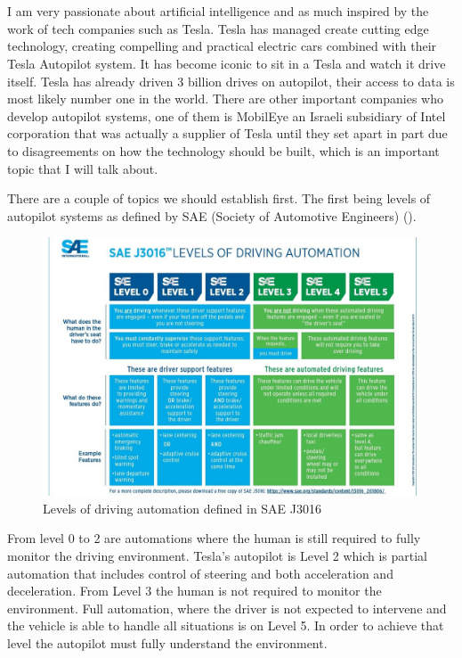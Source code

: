 \chapter{\bevezetes}

I am very passionate about artificial intelligence and as much inspired by the
work of tech companies such as Tesla. Tesla has managed create cutting edge
technology, creating compelling and practical electric cars combined with their
Tesla Autopilot system. It has become iconic to sit in a Tesla and watch it
drive itself. Tesla has already driven 3 billion drives on autopilot, their
access to data is most likely number one in the world. There are other important
companies who develop autopilot systems, one of them is MobilEye an Israeli
subsidiary of Intel corporation that was actually a supplier of Tesla until they
set apart in part due to disagreements on how the technology should be built,
which is an important topic that I will talk about.

There are a couple of topics we should establish first. The first being levels
of autopilot systems as defined by SAE (Society of Automotive Engineers)
(). 

\begin{figure}[!ht]
    \centering
    \includegraphics[width=150mm, keepaspectratio]{figures/levels-of-ad.jpg}
    \caption{Levels of driving automation defined in SAE J3016 \cite{j3016b}}
    \label{fig:J3016}
\end{figure}

From level 0 to 2 are automations where the human is still required to fully
monitor the driving environment. Tesla's autopilot is Level 2 which is partial
automation that includes control of steering and both acceleration and
deceleration. From Level 3 the human is not required to monitor the environment.
Full automation, where the driver is not expected to intervene and the
vehicle is able to handle all situations is on Level 5. In order to achieve that
level the autopilot must fully understand the environment.


